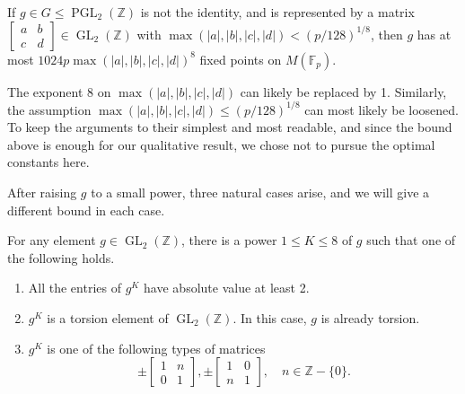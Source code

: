 \documentclass[AHL, Unicode, longabstracts, published]{cedram}
\newcommand{\Z}{\mathbb{Z}}
\newcommand{\F}{\mathbb{F}}
\DeclareMathOperator{\GL}{GL}
\DeclareMathOperator{\PGL}{PGL}
\DeclareMathOperator{\GL}{GL}
\newcommand{\Z}{\mathbb{Z}}
\begin{document}
\begin{theo}\label{thm:fixed-points}
If $g\in G\leq\PGL_{2}(\Z)$ is not the identity, and is represented by a matrix $\left[
\begin{smallmatrix}a & b\\
c & d
\end{smallmatrix}\right]\in\GL_{2}(\Z)$ with $\max(|a|,|b|,|c|,|d|) < (p/128)^{1/8}$, then $g$ has at most $1024p\max(|a|,|b|,|c|,|d|)^{8}$ fixed points on $M(\F_{p})$.
\end{theo}

The exponent 8 on $\max(|a|,|b|,|c|,|d|)$ can likely be replaced by 1. Similarly, the assumption $\max(|a|,|b|,|c|,|d|)\leq(p/128)^{1/8}$ can most likely be loosened. To keep the arguments to their simplest and most readable, and since the bound above is enough for our qualitative result, we chose not to pursue the optimal constants here.

After raising $g$ to a small power, three natural cases arise, and we will give a different bound in each case.


\begin{lemm}\label{lem:power}
For any element $g\in\GL_{2}(\Z)$, there is a power $1\leq K\leq8$ of $g$ such that one of the following holds.
\begin{enumerate}
\item All the entries of $g^{K}$ have absolute value at least 2.
\item $g^{K}$ is a torsion element of $\GL_{2}(\Z)$. In this case, $g$ is already torsion.
\item $g^{K}$ is one of the following types of matrices
\begin{equation}\label{eq:parabolic}
\pm
\begin{bmatrix}1 & n\\
0 & 1
\end{bmatrix},
\pm
\begin{bmatrix}1 & 0\\
n & 1
\end{bmatrix},\quad n\in\Z-\{0\}.
\end{equation}
\end{enumerate}
\end{lemm}
\end{document}
